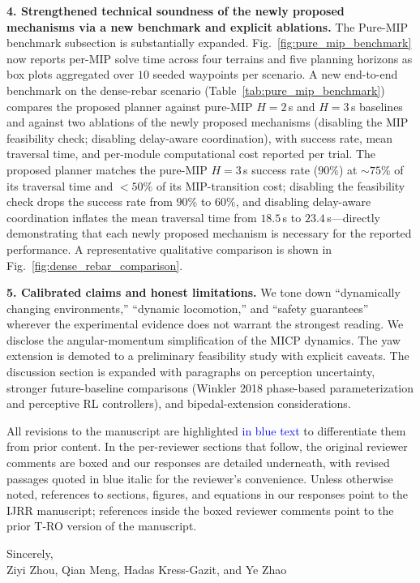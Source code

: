 \noindent \textbf{4. Strengthened technical soundness of the newly proposed mechanisms via a new benchmark and explicit ablations.} The Pure-MIP benchmark subsection is substantially expanded. Fig.~\ref{fig:pure_mip_benchmark} now reports per-MIP solve time across four terrains and five planning horizons as box plots aggregated over $10$ seeded waypoints per scenario. A new end-to-end benchmark on the dense-rebar scenario (Table~\ref{tab:pure_mip_benchmark}) compares the proposed planner against pure-MIP $H{=}2$\,s and $H{=}3$\,s baselines and against two ablations of the newly proposed mechanisms (disabling the MIP feasibility check; disabling delay-aware coordination), with success rate, mean traversal time, and per-module computational cost reported per trial. The proposed planner matches the pure-MIP $H{=}3$\,s success rate ($90\%$) at $\sim 75\%$ of its traversal time and $<50\%$ of its MIP-transition cost; disabling the feasibility check drops the success rate from $90\%$ to $60\%$, and disabling delay-aware coordination inflates the mean traversal time from $18.5$\,s to $23.4$\,s---directly demonstrating that each newly proposed mechanism is necessary for the reported performance. A representative qualitative comparison is shown in Fig.~\ref{fig:dense_rebar_comparison}.

\noindent \textbf{5. Calibrated claims and honest limitations.} We tone down ``dynamically changing environments,'' ``dynamic locomotion,'' and ``safety guarantees'' wherever the experimental evidence does not warrant the strongest reading. We disclose the angular-momentum simplification of the MICP dynamics. The yaw extension is demoted to a preliminary feasibility study with explicit caveats. The discussion section is expanded with paragraphs on perception uncertainty, stronger future-baseline comparisons (Winkler 2018 phase-based parameterization and perceptive RL controllers), and bipedal-extension considerations.

\vskip 0.1in

\noindent All revisions to the manuscript are highlighted \textcolor{blue}{in blue text} to differentiate them from prior content. In the per-reviewer sections that follow, the original reviewer comments are boxed and our responses are detailed underneath, with revised passages quoted in blue italic for the reviewer's convenience. Unless otherwise noted, references to sections, figures, and equations in our responses point to the IJRR manuscript; references inside the boxed reviewer comments point to the prior T-RO version of the manuscript.

\vskip 0.2in

\noindent Sincerely, \\
\noindent Ziyi Zhou, Qian Meng, Hadas Kress-Gazit, and Ye Zhao
